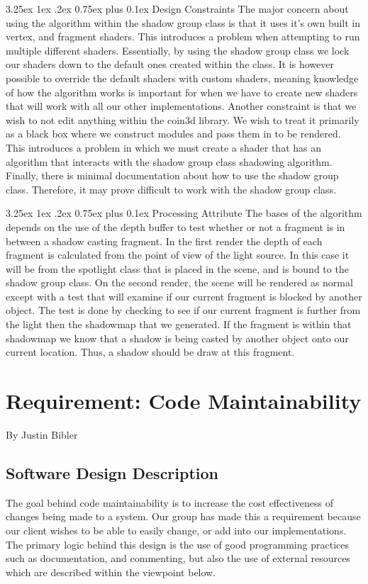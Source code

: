 \documentclass[10pt,journal,compsoc,draftclsnofoot]{IEEEtran}
\makeatletter
\newcommand\subparagraph{%
  \@startsection{subparagraph}{5}
  {\parindent}
  {3.25ex \@plus 1ex \@minus .2ex}
  {0.75ex plus 0.1ex}
  {\normalfont\normalsize\bfseries}}
\newcounter{subparagraph}[paragraph]
\makeatother
\begin{document}
\begin{flushleft}
\subparagraph{Design Constraints}
The major concern about using the algorithm within the shadow group class is that it uses it's own built in vertex, and fragment shaders.
This introduces a problem when attempting to run multiple different shaders.
Essentially, by using the shadow group class we lock our shaders down to the default ones created within the class.
It is however possible to override the default shaders with custom shaders, meaning knowledge of how the algorithm works is important for when we have to create new
shaders that will work with all our other implementations.
Another constraint is that we wish to not edit anything within the coin3d library.
We wish to treat it primarily as a black box where we construct modules and pass them in to be rendered.
This introduces a problem in which we must create a shader that has an algorithm that interacts with the shadow group class shadowing algorithm.
Finally, there is minimal documentation about how to use the shadow group class.
Therefore, it may prove difficult to work with the shadow group class.

\subparagraph{Processing Attribute}
The bases of the algorithm depends on the use of the depth buffer to test whether or not a fragment is in between a shadow casting fragment.
In the first render the depth of each fragment is calculated from the point of view of the light source.
In this case it will be from the spotlight class that is placed in the scene, and is bound to the shadow group class.
On the second render, the scene will be rendered as normal except with a test that will examine if our
current fragment is blocked by another object.
The test is done by checking to see if our current fragment is further from the light then the shadowmap that we generated.
If the fragment is within that shadowmap we know that a shadow is being casted by another object onto our current location.
Thus, a shadow should be draw at this fragment. \cite{shadow}

\newpage

\section{Requirement: Code Maintainability}
\large{By Justin Bibler}

\normalsize
\subsection{Software Design Description}
The goal behind code maintainability is to increase the cost effectiveness of changes being made to a system. \cite{maintain}
Our group has made this a requirement because our client wishes to be able to easily change, or add into our implementations.
The primary logic behind this design is the use of good programming practices such as documentation, and commenting, but also the use of external resources which are described within the viewpoint below.


\end{flushleft}
\end{document}
